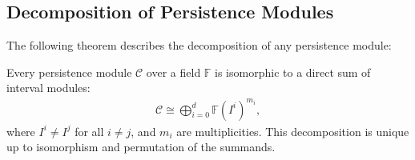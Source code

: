 \subsection{Decomposition of Persistence Modules}
The following theorem describes the decomposition of any persistence module:

\begin{theorem}[Decomposition]{\cite[\S 1.5]{chazal2016structure}}
\label{decompositionPersistenceModules}
Every persistence module $\mathcal{C}$ over a field $\mathbb{F}$ is isomorphic to a direct sum of interval modules:
\begin{align}
	\mathcal{C} \cong \bigoplus_{i=0}^{d} \mathbb{F}(I^i)^{m_i},
\end{align}
where $I^i \neq I^j$ for all $i \neq j$, and $m_i$ are multiplicities. This decomposition is unique up to isomorphism and permutation of the summands.
\end{theorem}

